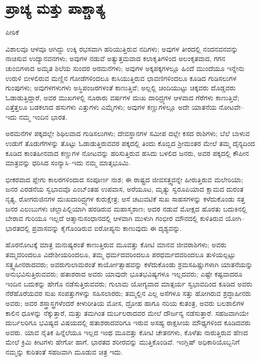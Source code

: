 
\chapter{ಪ್ರಾಚ್ಯ ಮತ್ತು ಪಾಶ್ಚಾತ್ಯ}

\begin{center}
ಪೀಠಿಕೆ
\end{center}

ವಿಶಾಲವೂ ಆಳವೂ ಆಗಿದ್ದು ಉಕ್ಕಿ ರಭಸವಾಗಿ ಹರಿಯುತ್ತಿರುವ ನದಿಗಳು; ಅವುಗಳ ತೀರದಲ್ಲಿ ನಂದನವನವನ್ನು ನಾಚಿಸುವ ಉದ್ಯಾನವನಗಳು; ಅವುಗಳ ನಡುವೆ ಅತ್ಯುತ್ತಮವಾದ ಕಲಾಕೃತಿಗಳಿಂದ ಅಲಂಕೃತವಾದ, ಗಗನ ಚುಂಬಿಗಳಾದ ಅಮೃತ ಶಿಲೆಯ ಸುಂದರ ಅರಮನೆಗಳು; ಅವುಗಳ ಅಕ್ಕಪಕ್ಕಗಳಲ್ಲೂ ಹಿಂದೆ ಮುಂದೆಯೂ ಇನ್ನೇನು ಉರುಳಿ ಬೀಳಲಿರುವ ಮಣ್ಣಿನ ಗೋಡೆಗಳಿಂದಲೂ ಕುಸಿಯುತ್ತಿರುವ ಛಾವಣಿಗಳಿಂದಲೂ ಕೂಡಿದ ಗುಡಿಸಲುಗಳ ಗುಂಪುಗಳು; ಅವುಗಳಗಳುಗಳು ಅಸ್ಥಿಪಂಜರಗಳಂತೆ ಕಾಣುತ್ತಿವೆ; ಅಲ್ಲಲ್ಲಿ ಚಿಂದಿಯುಟ್ಟು ಚಿಕ್ಕವರು ದೊಡ್ಡವರು ಓಡಾಡುತ್ತಿದ್ದಾರೆ, ಅವರ ಮುಖಗಳಲ್ಲಿ ನೂರಾರು ವರ್ಷಗಳ ದುಃಖ ದಾರಿದ್ರ್ಯಗಳ ಆಳವಾದ ಗೆರೆಗಳು ಕಾಣುತ್ತಿವೆ; ಎತ್ತೆತ್ತಲೂ ಬಡಕಲಾದ ಹಸುಗಳು ಎತ್ತುಗಳು ಎಮ್ಮೆಗಳು; ಅವುಗಳ ಕಣ್ಣುಗಳಲ್ಲೂ ಅದೇ ಯಾತನೆಯ ನೋಟವೇ– ಇದು ನಮ್ಮ ಇಂದಿನ ಭಾರತ.

ಅರಮನೆಗಳ ಪಕ್ಕದಲ್ಲೇ ಶಿಥಿಲವಾದ ಗುಡಿಸಲುಗಳು; ದೇವಸ್ಥಾನಗಳ ಸಮೀಪ ದಲ್ಲೇ ಕಸದ ರಾಶಿಗಳು; ಬೆಲೆ ಬಾಳುವ ಉಡುಗೆ ತೊಡುಗೆಗಳನ್ನು ತೊಟ್ಟು ಓಡಾಡುತ್ತಿರುವವರ ಪಕ್ಕದಲ್ಲಿ ತಿಂದು ಕೊಬ್ಬಿದ ಶ‍್ರೀಮಂತರ ಮೇಲೆ ತಮ್ಮ ದೈನ್ಯದಿಂದ ಕೂಡಿದ ಕಾಂತಹೀನವಾದ ಕಣ್ಣುಗಳ ನೋಟವನ್ನು ಹರಿಸುತ್ತಿರುವ ಹಸಿದು ಬಳಲಿದ ಜನರು, ಅವರ ಪಕ್ಕದಲ್ಲಿ ಕೌಪೀನ ಮಾತ್ರವನ್ನು ಧರಿಸಿದ ಸಂನ್ಯಾಸಿ–ಇದು ನಮ್ಮ ಮಾತೃಭೂಮಿ.

ಭೀಕರವಾದ ಪ್ಲೇಗು ಕಾಲರಗಳಿಂದಾದ ಸಂಪೂರ್ಣ ನಾಶ; ಈ ರಾಷ್ಟ್ರದ ಜೀವಸತ್ತ್ವ\break ವನ್ನೇ ಹೀರುತ್ತಿರುವ ಮಲೇರಿಯಾ; ಜನರ ಎರಡನೆಯ ಸ್ವಭಾವವೊ ಎಂಬ್ಂತಹ ಉಪವಾಸ, ಅರೆಯೂಟ, ಮೃತ್ಯು ಸ್ವರೂಪಿಯಾದ ಕ್ಷಾಮದ ದುರಂತ ನೃತ್ಯ, ರೋಗರುಜಿನಗಳ ದುಃಖದಾರಿದ್ರ್ಯಗಳ ಕುರುಕ್ಷೇತ್ರ; ಆಸೆ ಚಟುವಟಿಕೆ ಸುಖ ಸಾಹಸಗಳನ್ನು ಕಳೆದುಕೊಂಡು ಸತ್ತ ಜನರ ಎಲುಬುಗಳು ಚಲ್ಲಾಪಿಲ್ಲಿಯಾಗಿ ಹರಡಿರುವ ಮಹಾಸ್ಮಶಾಣ; ಅದರ ನಡುವೆ ಮೋಕ್ಷದ ಹೊರತು ಬದುಕಿನಲ್ಲಿ ಬೇರಾವ ಗುರಿಯೂ ಇಲ್ಲದೆ ಆತ್ಮಾನುಸಂಧಾನದಲ್ಲಿ ಆಳವಾಗಿ ಮುಳುಗಿ ಗಂಭೀರ ಮೌನದಲ್ಲಿ ಕುಳಿತಿರುವ ಯೋಗಿ– ಭಾರತದಲ್ಲಿ ಪ್ರವಾಸವನ್ನು ಕೈಗೊಂಡಿರುವ ಐರೋಪ್ಯನು ಕಾಣುವುದು ಈ ದೃಶ್ಯವನ್ನು.

ಹೊರನೋಟಕ್ಕೆ ಮಾತ್ರ ಮನುಷ್ಯರಂತೆ ಕಾಣುತ್ತಿರುವ ಮೂವತ್ತು ಕೋಟಿ ಮಾನವ ಜೀವರಾಶಿಗಳು; ಅವರು ತಮ್ಮವರಿಂದಲೂ ವಿದೇಶೀಯರಿಂದಲೂ, ತಮ್ಮ ಧರ್ಮದವರಿಂದಲೂ ಪರಧರ್ಮದವರಿಂದಲೂ ತುಳಿಯಲ್ಪಟ್ಟು ಸತ್ತ್ವಹೀನರಾದವರು; ಅವರು\break ಗುಲಾಮರಂತೆ ಕಾರ್ಯೋತ್ಸಾಹವನ್ನು ಕಳೆದುಕೊಂಡು ಶ್ರಮಸಹಿಷ್ಣುಗಳಾಗಿ ಯಾತನೆಯನ್ನು ಅನುಭವಿಸುತ್ತಿರುವವರು; ಹತಾಶರಾದ ಅವರು ಯಾವುದೇ ಭೂತಭವಿಷ್ಯಗಳೂ ಇಲ್ಲದವರು; ಎಷ್ಟೇ ಕಷ್ಟವಾದರೂ ಇಂದಿನ ಬದುಕನ್ನು ಹೇಗೊ ನಡೆಸುತ್ತಿರುವವರು; ಗುಲಾಮ ಯೋಗ್ಯವಾದ ಮಾತ್ಸರ್ಯ ಸ್ವಭಾವದಿಂದ ಕೂಡಿದ ಅವರು ನೆರೆಹೊರೆಯವರ ಸುಖ ಸಂಪತ್ತುಗಳನ್ನು ಸಹಿಸಲಾರರು; ತಮ್ಮಲ್ಲಿನ ಎಲ್ಲ ಅಸೆಗಳೂ ಸತ್ತು ಹೋಗಿರುವ ಶ್ರದ್ಧಾಹೀನರು ಅವರು; ಅವರ ಶಸ್ತ್ರಾಸ್ತ್ರಗಳೆಂದರೆ ಕೀಳುರೀತಿಯ ಮೋಸ, ದ್ರೋಹ ಹಾಗೂ ನರಿಯ ಕುತಂತ್ರ, ಅವರು ಬಲಶಾಲಿಗಳ ಕಾಲಿನ ಧೂಳನ್ನು ನೆಕ್ಕುತ್ತಾರೆ, ಮತ್ತು ತಮಗಿಂತ ದುರ್ಬಲರಾದವರ ಮೇಲೆ ದೌರ್ಜನ್ಯ ನಡೆಸುತ್ತಾರೆ. ಸಹಜವಾಗಿಯೇ ದುರ್ಬಲರಿಗೂ ಭವಿಷ್ಯದ ವಿಷಯದಲ್ಲಿ ಹತಾಶರಾದವರಿಗೂ ಇರುವ ಅಸಹ್ಯ ರಾಕ್ಷಸೀಯ ಮೌಢ್ಯಗಳಿಂದ ಕೂಡಿದವರು ಅವರು. ಯಾವ ನೈತಿಕ ಹಿನ್ನೆಲೆಯೂ ಇಲ್ಲದ ಇಂಥ ಮೂವತ್ತು ಕೋಟಿ ಚೇತನಗಳು, ಕೊಳೆತು ನಾರುತ್ತಿರುವ ಹೆಣದ ಮೇಲೆ ಕ್ರಿಮಿ ಕೀಟಗಳು ಹೇಗೋ ಹಾಗೆ, ಭಾರತದ ಶರೀರವನ್ನು ಮುತ್ತಿಕೊಂಡಿವೆ. ಇಂಗ್ಲಿಷ್​ ಅಧಿಕಾರಿಯೊಬ್ಬನಿಗೆ ನಮ್ಮನ್ನು ಕುರಿತಂತೆ ಸಹಜವಾಗಿ ಮೂಡುವ ಚಿತ್ರ ಇದು.

